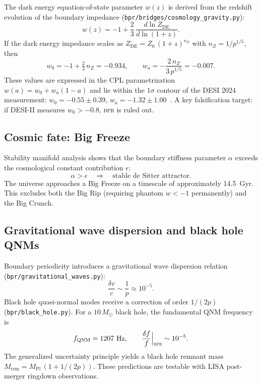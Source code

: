 \documentclass[aps,prd,twocolumn,superscriptaddress,longbibliography,nofootinbib]{revtex4-2}
\newcommand{\MPl}{M_{\mathrm{Pl}}}
\newcommand{\Zimp}{Z}
\newcommand{\Zvac}{Z_0}
\newcommand{\bpr}{\textsc{bpr}}
\begin{document}
The dark energy equation-of-state parameter $w(z)$ is derived from
the redshift evolution of the boundary impedance
(\texttt{bpr/bridges/cosmology\_gravity.py}):
\begin{equation}
w(z) = -1 + \frac{2}{3}\, \frac{d\ln \Zimp_{\mathrm{DE}}}{d\ln(1+z)}.
\label{eq:wz}
\end{equation}
If the dark energy impedance scales as $\Zimp_{\mathrm{DE}} =
\Zvac\, (1+z)^{n_Z}$ with $n_Z = 1/p^{1/5}$, then
\begin{equation}
w_0 = -1 + \tfrac{2}{3}\, n_Z = -0.934, \qquad
w_a = -\frac{2\, n_Z}{3\, p^{1/5}} = -0.007.
\label{eq:w0wa}
\end{equation}
These values are expressed in the CPL parametrization $w(a) = w_0 +
w_a(1-a)$ and lie within the $1\sigma$ contour of the DESI 2024
measurement: $w_0 = -0.55 \pm 0.39$, $w_a = -1.32 \pm
1.00$~\cite{DESI2024}.  A key falsification target: if DESI-II
measures $w_0 > -0.8$, \bpr{} is ruled out.

\subsection{Cosmic fate: Big Freeze}

Stability manifold analysis shows that the boundary stiffness
parameter $\alpha$ exceeds the cosmological constant contribution
$\epsilon$:
\begin{equation}
\alpha > \epsilon \quad \Longrightarrow \quad
\text{stable de Sitter attractor}.
\label{eq:cosmic_fate}
\end{equation}
The universe approaches a Big Freeze on a timescale of approximately
14.5~Gyr.  This excludes both the Big Rip (requiring phantom
$w < -1$ permanently) and the Big Crunch.

\subsection{Gravitational wave dispersion and black hole QNMs}

Boundary periodicity introduces a gravitational wave dispersion
relation (\texttt{bpr/gravitational\_waves.py}):
\begin{equation}
\frac{\delta v}{c} \sim \frac{1}{p} \approx 10^{-5}.
\label{eq:gw_dispersion}
\end{equation}
Black hole quasi-normal modes receive a correction of order
$1/(2p)$ (\texttt{bpr/black\_hole.py}).  For a $10\,M_\odot$ black
hole, the fundamental QNM frequency is
\begin{equation}
f_{\mathrm{QNM}} = 1207~\text{Hz}, \qquad
\frac{\delta f}{f}\Big|_{\bpr} \sim 10^{-5}.
\label{eq:qnm}
\end{equation}
The generalized uncertainty principle yields a black hole remnant
mass $M_{\mathrm{rem}} = \MPl\,(1 + 1/(2p))$.  These predictions
are testable with LISA post-merger ringdown observations.
\end{document}
